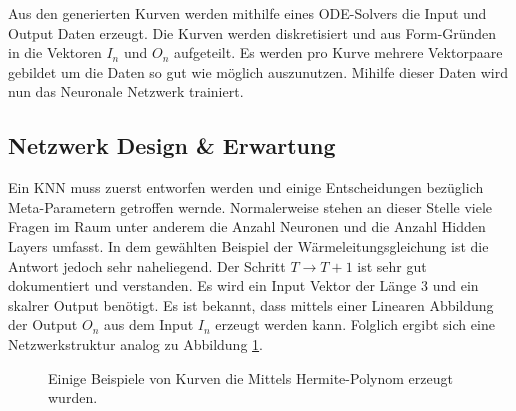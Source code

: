 	Aus den generierten Kurven werden mithilfe eines ODE-Solvers die Input und Output Daten erzeugt. Die Kurven werden diskretisiert und aus Form-Gründen in die Vektoren $I_n$ und $O_n$ aufgeteilt. Es werden pro Kurve mehrere Vektorpaare gebildet um die Daten so gut wie möglich auszunutzen. Mihilfe dieser Daten wird nun das Neuronale Netzwerk trainiert.
	
	\subsection{Netzwerk Design \& Erwartung}
	Ein KNN muss zuerst entworfen werden und einige Entscheidungen bezüglich Meta-Parametern getroffen wernde. Normalerweise stehen an dieser Stelle viele Fragen im Raum unter anderem die Anzahl Neuronen und die Anzahl Hidden Layers umfasst. In dem gewählten Beispiel der Wärmeleitungsgleichung ist die Antwort jedoch sehr naheliegend. Der Schritt $T \rightarrow T+1$ ist sehr gut dokumentiert und verstanden. Es wird ein Input Vektor der Länge 3 und ein skalrer Output benötigt. Es ist bekannt, dass mittels einer Linearen Abbildung der Output $O_n$ aus dem Input $I_n$ erzeugt werden kann. Folglich ergibt sich eine Netzwerkstruktur analog zu Abbildung \ref{fig:mst_neuronalnetworkdemo}.
	
	\begin{figure}
		\centering

		\label{fig:mst_neuronalnetworkdemo}
		\caption{Einige Beispiele von Kurven die Mittels Hermite-Polynom erzeugt wurden.}
	\end{figure}
	
